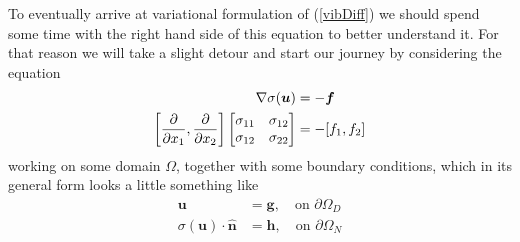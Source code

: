 \documentclass[paper=a4, fontsize=11pt]{scrartcl} %
\begin{document}
To eventually arrive at variational formulation of (\ref{vibDiff}) we should spend some time with the right hand side of this equation to better understand it. For that reason we will take a slight detour and start our journey by considering the equation
\begin{align}
\label{linEl}
\nabla \sigma(\boldsymbol{u}) &= - \boldsymbol{f} \\
\left[\frac{\partial}{\partial x_1},  \frac{\partial}{\partial x_2}\right]\begin{bmatrix}
\sigma_{11} & \sigma_{12} \\
\sigma_{12} & \sigma_{22}
\end{bmatrix} &= -[f_1,f_2] \notag
\end{align}
working on some domain $\Omega$,
together with some boundary conditions, which in its general form looks a little something like
\begin{align*}
\boldsymbol{u} &= \boldsymbol{g}, \quad \text{on } \partial \Omega_D \\
\sigma(\boldsymbol{u})\cdot \boldsymbol{\hat{n}} &= \boldsymbol{h}, \quad \text{on } \partial \Omega_N
\end{align*}
\end{document}
